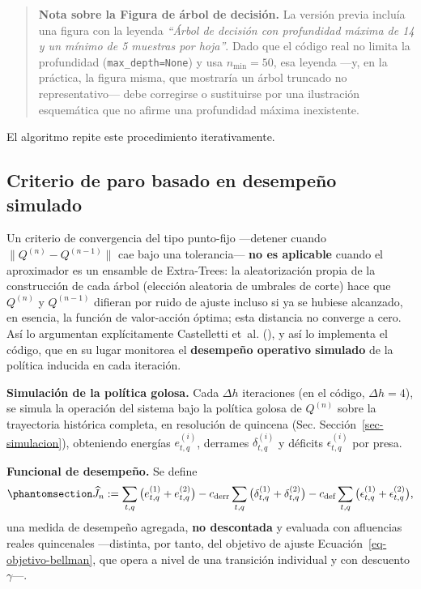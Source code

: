 \documentclass[
  spanish,
  letterpaper,
]{scrreprt}
\theoremstyle{definition}
\theoremstyle{remark}
\begin{document}
\begin{quote}
\textbf{Nota sobre la Figura de árbol de decisión.} La versión previa
incluía una figura con la leyenda \emph{``Árbol de decisión con
profundidad máxima de 14 y un mínimo de 5 muestras por hoja''}. Dado que
el código real no limita la profundidad (\texttt{max\_depth=None}) y usa
\(n_{\min}=50\), esa leyenda ---y, en la práctica, la figura misma, que
mostraría un árbol truncado no representativo--- debe corregirse o
sustituirse por una ilustración esquemática que no afirme una
profundidad máxima inexistente.
\end{quote}

El algoritmo repite este procedimiento iterativamente.

\subsection{Criterio de paro basado en desempeño
simulado}\label{sec-criterio-paro}

Un criterio de convergencia del tipo punto-fijo ---detener cuando
\(\|Q^{(n)}-Q^{(n-1)}\|\) cae bajo una tolerancia--- \textbf{no es
aplicable} cuando el aproximador es un ensamble de Extra-Trees: la
aleatorización propia de la construcción de cada árbol (elección
aleatoria de umbrales de corte) hace que \(Q^{(n)}\) y \(Q^{(n-1)}\)
difieran por ruido de ajuste incluso si ya se hubiese alcanzado, en
esencia, la función de valor-acción óptima; esta distancia no converge a
cero. Así lo argumentan explícitamente Castelletti et~al.
(), y así lo implementa el código,
que en su lugar monitorea el \textbf{desempeño operativo simulado} de la
política inducida en cada iteración.

\textbf{Simulación de la política golosa.} Cada \(\Delta h\) iteraciones
(en el código, \(\Delta h=4\)), se simula la operación del sistema bajo
la política golosa de \(Q^{(n)}\) sobre la trayectoria histórica
completa, en resolución de quincena (Sec. Sección~\ref{sec-simulacion}),
obteniendo energías \(e^{(i)}_{t,q}\), derrames \(\delta^{(i)}_{t,q}\) y
déficits \(\epsilon^{(i)}_{t,q}\) por presa.

\textbf{Funcional de desempeño.} Se define
\begin{equation}\protect\phantomsection\label{eq-desempeno-Jn}{\widehat J_n := \sum_{t,q}\big(e^{(1)}_{t,q}+e^{(2)}_{t,q}\big) - c_{\text{derr}}\sum_{t,q}\big(\delta^{(1)}_{t,q}+\delta^{(2)}_{t,q}\big) - c_{\text{def}}\sum_{t,q}\big(\epsilon^{(1)}_{t,q}+\epsilon^{(2)}_{t,q}\big),}\end{equation}
una medida de desempeño agregada, \textbf{no descontada} y evaluada con
afluencias reales quincenales ---distinta, por tanto, del objetivo de
ajuste Ecuación~\ref{eq-objetivo-bellman}, que opera a nivel de una
transición individual y con descuento \(\gamma\)---.
\end{document}
